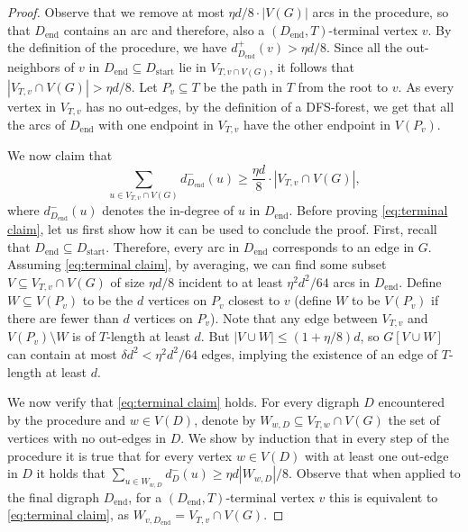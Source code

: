 \documentclass[10pt]{article}
\theoremstyle{definition}
\let\leq\leqslant
\let\geq\geqslant
\begin{document}
\begin{proof}
    Observe that we remove at most $\eta d/8\cdot |V(G)|$ arcs in the procedure, so that $D_{\mathrm{end}}$ contains an arc and therefore, also a $(D_{\mathrm{end}},T)$-terminal vertex $v$. By the definition of the procedure, we have $d^+_{D_{\mathrm{end}}}(v)>\eta d/8$. Since all the out-neighbors of $v$ in $D_{\mathrm{end}}\subseteq D_{\mathrm{start}}$ lie in $V_{T,v\cap V(G)}$, it follows that
    $|V_{T,v}\cap V(G)|>\eta d/8$. Let $P_v\subseteq T$ be the path in $T$ from the root to $v$. As every vertex in $V_{T,v}$ has no out-edges, by the definition of a DFS-forest, we get that all the arcs of $D_{\mathrm{end}}$ with one endpoint in $V_{T,v}$ have the other endpoint in $V(P_v)$. 
    \par We now claim that
    \begin{equation}\label{eq:terminal claim}
    \sum_{u\in V_{T,v}\cap V(G)}d_{D_{\mathrm{end}}}^-(u)\geq \frac{\eta d}8\cdot |V_{T,v}\cap V(G)|,    
    \end{equation}
    where $d^{-}_{D_{\mathrm{end}}}(u)$ denotes the in-degree of $u$ in $D_{\mathrm{end}}$.
    Before proving \eqref{eq:terminal claim}, 
    let us first show how it can be used to conclude the proof. First, recall that $D_{\mathrm{end}}\subseteq D_{\mathrm{start}}$. Therefore, every arc in $D_{\mathrm{end}}$ corresponds to an edge in $G$. Assuming \eqref{eq:terminal claim}, by averaging, we can find some subset $V\subseteq V_{T,v}\cap V(G)$ of size $\eta d/8$ incident to at least $\eta^2 d^2/64$ arcs in $D_{\mathrm{end}}$. Define $W\subseteq V(P_v)$ to be the $d$ vertices on $P_v$ closest to $v$ (define $W$ to be $V(P_v)$ if there are fewer than $d$ vertices on $P_v$). Note that any edge between $V_{T,v}$ and $V(P_v)\setminus W$ is of $T$-length at least $d$. But $|V\cup W|\leq (1+\eta/8)d$, so $G[V\cup W]$ can contain at most $\delta d^2<\eta^2 d^2/64$ edges, implying the existence of an edge of $T$-length at least $d$. 
    \par We now verify that \eqref{eq:terminal claim} holds. For every digraph $D$ encountered by the procedure and $w\in V(D)$, denote by $W_{w,D}\subseteq V_{T,w}\cap V(G)$ the set of vertices with no out-edges in $D$. We show by induction that in every step of the procedure it is true that for every vertex $w\in V(D)$ with at least one out-edge in $D$ it holds that $\sum_{u\in W_{w,D}}d_{D}^-(u)\geq \eta d|W_{w,D}|/8$. Observe that when applied to the final digraph $D_{\mathrm{end}}$, for a $(D_{\mathrm{end}},T)$-terminal vertex $v$ this is equivalent to \eqref{eq:terminal claim}, as $W_{v,D_{\mathrm{end}}}=V_{T,v}\cap V(G)$.
    

\end{proof}
\end{document}
